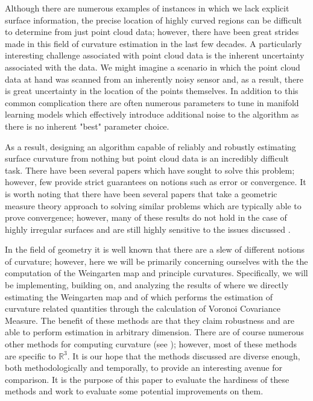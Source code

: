 \documentclass{article}
\begin{document}
Although there are numerous examples of instances in which we lack explicit surface information, the precise location of highly curved regions can be difficult to determine from just point cloud data; however, there have been great strides made in this field of curvature estimation in the last few decades. A particularly interesting challenge associated with point cloud data is the inherent uncertainty associated with the data. We might imagine a scenario in which the point cloud data at hand was scanned from an inherently noisy sensor and, as a result, there is great uncertainty in the location of the points themselves. In addition to this common complication there are often numerous parameters to tune in manifold learning models which effectively introduce additional noise to the algorithm as there is no inherent "best" parameter choice. 

As a result, designing an algorithm capable of reliably and robustly estimating surface curvature from nothing but point cloud data is an incredibly difficult task. There have been several papers which have sought to solve this problem; however, few provide strict guarantees on notions such as error or convergence. It is worth noting that there have been several papers that take a geometric measure theory approach to solving similar problems which are typically able to prove convergence; however, many of these results do not hold in the case of highly irregular surfaces and are still highly sensitive to the issues discussed \cite{chazal2008stability, cohen2006,Buet2018}.

In the field of geometry it is well known that there are a slew of different notions of curvature; however, here we will be primarily concerning ourselves with the the computation of the Weingarten map and principle curvatures. Specifically, we will be implementing, building on, and analyzing the results of \cite{Cao_2021}  where we directly estimating the Weingarten map and of \cite{merigotVORONOI2011} which performs the estimation of curvature related quantities through the calculation of Voronoi Covariance Measure. The benefit of these methods are that they claim robustness and are able to perform  estimation in arbitrary dimension. There are of course numerous other methods for computing curvature (see \cite{MAGID2007139}); however, most of these methods are specific to $\mathbb{R}^3$. It is our hope that the methods discussed are diverse enough, both methodologically and temporally, to provide an interesting avenue for comparison. It is the purpose of this paper to evaluate the hardiness of these methods and work to evaluate some potential improvements on them.   
\end{document}
